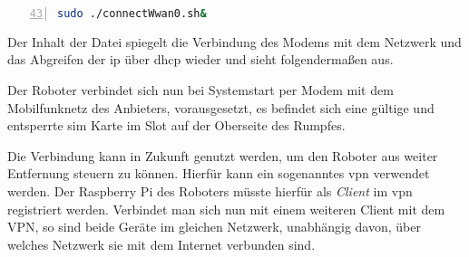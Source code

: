\begin{lstlisting}[language=Bash,numbers=left,xleftmargin=\dimexpr2.5em-1pt,framexleftmargin=2em,firstnumber=43]
sudo ./connectWwan0.sh&
\end{lstlisting}

\noindent Der Inhalt der Datei spiegelt die Verbindung des Modems mit dem Netzwerk und das Abgreifen der \gls{ip}
über \gls{dhcp} wieder und sieht folgendermaßen aus.



\noindent Der Roboter verbindet sich nun bei Systemstart per Modem mit dem Mobilfunknetz des Anbieters, vorausgesetzt,
es befindet sich eine gültige und entsperrte \gls{sim} Karte im Slot auf der Oberseite des Rumpfes.


Die Verbindung kann in Zukunft genutzt werden, um den Roboter aus weiter Entfernung steuern zu können.
Hierfür kann ein sogenanntes \gls{vpn} verwendet werden.
Der Raspberry Pi des Roboters müsste hierfür als \emph{Client} im \gls{vpn} registriert werden.
Verbindet man sich nun mit einem weiteren Client mit dem VPN, so sind beide Geräte im gleichen Netzwerk, unabhängig
davon, über welches Netzwerk sie mit dem Internet verbunden sind.

